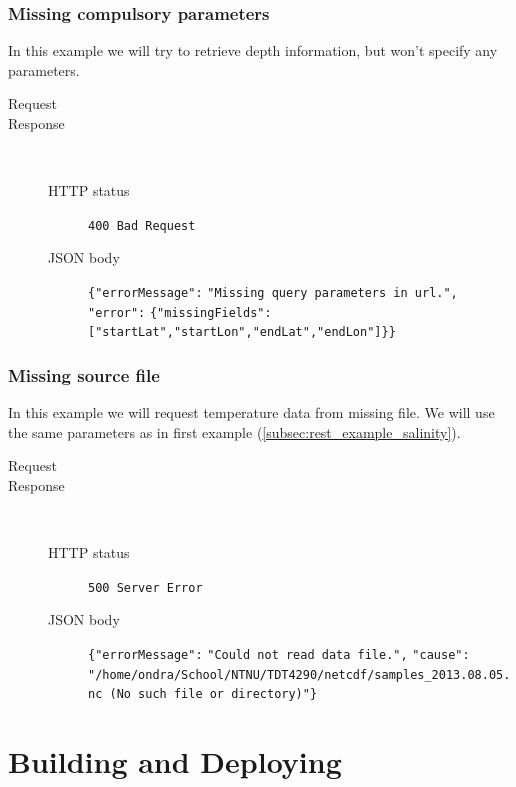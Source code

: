 \documentclass[11pt,a4paper,titlepage,oneside]{report}
\begin{document}
\subsection{Missing compulsory parameters}
In this example we will try to retrieve depth information, but won't specify any parameters.

\begin{description}
	\item[Request] 
	\item[Response] ~\\
		\begin{description}
			\item[\gls{HTTP} status] \texttt{400 Bad Request}
			\item[JSON body] \texttt{\{"errorMessage":} \texttt{"Missing~query~parameters~in~url.",} \texttt{"error":} \texttt{\{"missingFields":} \texttt{["startLat","startLon","endLat","endLon"]\}\}}
		\end{description}
\end{description}

\subsection{Missing source file}
In this example we will request temperature data from missing file. We will use the same parameters as in first example (\ref{subsec:rest_example_salinity}).

\begin{description}
	\item[Request] 
	\item[Response] ~\\
		\begin{description}
			\item[\gls{HTTP} status] \texttt{500 Server Error}
			\item[JSON body] \texttt{\{"errorMessage":} \texttt{"Could not read data file.",} \texttt{"cause":} \texttt{"/home/ondra/School/NTNU/TDT4290/netcdf/samples\_2013.08.05.nc (No such file or directory)"\}}
		\end{description}
\end{description}

\chapter{Building and Deploying}
\end{document}
